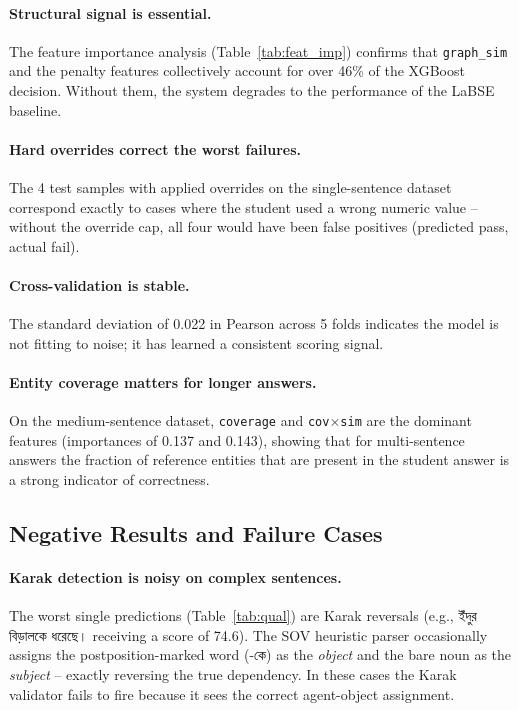 \documentclass[11pt]{article}
\newcommand{\bn}[1]{{\bengalifont #1}}
\begin{document}
\paragraph{Structural signal is essential.} The feature importance analysis (Table~\ref{tab:feat_imp}) confirms that \texttt{graph\_sim} and the penalty features collectively account for over 46\% of the XGBoost decision. Without them, the system degrades to the performance of the LaBSE baseline.

\paragraph{Hard overrides correct the worst failures.} The 4 test samples with applied overrides on the single-sentence dataset correspond exactly to cases where the student used a wrong numeric value -- without the override cap, all four would have been false positives (predicted pass, actual fail).

\paragraph{Cross-validation is stable.} The standard deviation of 0.022 in Pearson across 5 folds indicates the model is not fitting to noise; it has learned a consistent scoring signal.

\paragraph{Entity coverage matters for longer answers.} On the medium-sentence dataset, \texttt{coverage} and \texttt{cov$\times$sim} are the dominant features (importances of 0.137 and 0.143), showing that for multi-sentence answers the fraction of reference entities that are present in the student answer is a strong indicator of correctness.

\subsection{Negative Results and Failure Cases}

\paragraph{Karak detection is noisy on complex sentences.} The worst single predictions (Table~\ref{tab:qual}) are Karak reversals (e.g., \bn{ইঁদুর বিড়ালকে ধরেছে।} receiving a score of 74.6). The SOV heuristic parser occasionally assigns the postposition-marked word (\bn{-কে}) as the \emph{object} and the bare noun as the \emph{subject} -- exactly reversing the true dependency. In these cases the Karak validator fails to fire because it sees the correct agent-object assignment.
\end{document}
